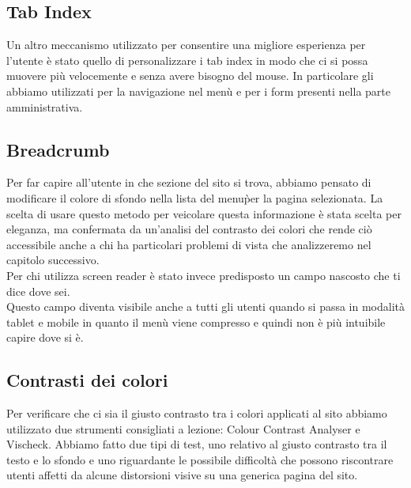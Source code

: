 \subsection{Tab Index}
Un altro meccanismo utilizzato per consentire una migliore esperienza per l'utente \`e stato quello di personalizzare i tab index in modo che ci si possa muovere pi\`u velocemente e senza avere bisogno del mouse.
In particolare gli abbiamo utilizzati per la navigazione nel men\`u e per i form presenti nella parte amministrativa.

\subsection{Breadcrumb}
Per far capire all'utente in che sezione del sito si trova, abbiamo pensato di modificare il colore di sfondo nella lista del menu\`per la pagina selezionata. La scelta di usare questo metodo  per veicolare questa informazione \`e stata scelta per eleganza, ma confermata da un'analisi del contrasto dei colori che rende ci\`o accessibile anche a chi ha particolari problemi di vista che analizzeremo nel capitolo successivo.
\\  Per chi utilizza screen reader è stato invece predisposto un campo nascosto che ti dice dove sei.
\\ Questo campo diventa visibile anche a tutti gli utenti quando si passa in modalità tablet e mobile in quanto il men\`u viene compresso e quindi non \`e pi\`u intuibile capire dove si \`e.

\subsection{Contrasti dei colori}
Per verificare che ci sia il giusto contrasto tra i colori applicati al sito abbiamo utilizzato due strumenti consigliati a lezione: Colour Contrast Analyser e Vischeck.
Abbiamo fatto due tipi di test, uno relativo al giusto contrasto tra il testo e lo sfondo e uno riguardante le possibile difficolt\`a che possono riscontrare utenti affetti da alcune distorsioni visive su una generica pagina del sito.
